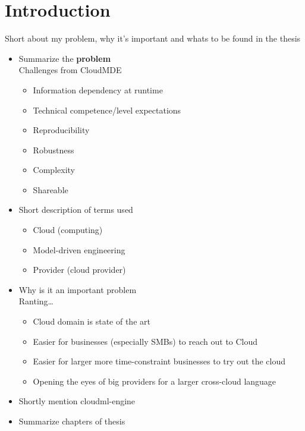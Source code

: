 \section{Introduction}

Short about my problem, why it's important and whats to be found in the thesis 

\begin{itemize}
  \item Summarize the \textbf{problem} \\
      Challenges from CloudMDE
    \begin{itemize}
      \item Information dependency at runtime
      \item Technical competence/level expectations
      \item Reproducibility
      \item Robustness
      \item Complexity
      \item Shareable
    \end{itemize}
  \item Short description of terms used
    \begin{itemize}
      \item Cloud (computing)
      \item Model-driven engineering
      \item Provider (cloud provider)
    \end{itemize}
  \item Why is it an important problem \\
      Ranting\ldots
    \begin{itemize}
      \item Cloud domain is state of the art
      \item Easier for businesses (especially SMBs) to reach out to Cloud
      \item Easier for larger more time-constraint businesses to try out the cloud
      \item Opening the eyes of big providers for a larger cross-cloud language
    \end{itemize}
  \item Shortly mention cloudml-engine
  \item Summarize chapters of thesis
\end{itemize}
